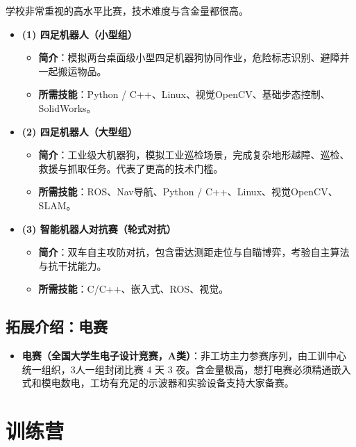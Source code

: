 \documentclass[a4paper,11pt,oneside]{scrreprt}
\begin{document}
学校非常重视的高水平比赛，技术难度与含金量都很高。

\begin{itemize}
    \item \textbf{(1) 四足机器人（小型组）}
    \begin{itemize}
        \item \textbf{简介}：模拟两台桌面级小型四足机器狗协同作业，危险标志识别、避障并一起搬运物品。
        \item \textbf{所需技能}：Python / C++、Linux、视觉OpenCV、基础步态控制、SolidWorks。
    \end{itemize}
    \item \textbf{(2) 四足机器人（大型组）}
    \begin{itemize}
        \item \textbf{简介}：工业级大机器狗，模拟工业巡检场景，完成复杂地形越障、巡检、救援与抓取任务。代表了更高的技术门槛。
        \item \textbf{所需技能}：ROS、Nav导航、Python / C++、Linux、视觉OpenCV、SLAM。
    \end{itemize}
    \item \textbf{(3) 智能机器人对抗赛（轮式对抗）}
    \begin{itemize}
        \item \textbf{简介}：双车自主攻防对抗，包含雷达测距走位与自瞄博弈，考验自主算法与抗干扰能力。
        \item \textbf{所需技能}：C/C++、嵌入式、ROS、视觉。
    \end{itemize}
\end{itemize}

\setcounter{subsection}{3}
\subsection{拓展介绍：电赛}

\begin{itemize}
    \item \textbf{电赛（全国大学生电子设计竞赛，A类）}：非工坊主力参赛序列，由工训中心统一组织，3人一组封闭比赛 4 天 3 夜。含金量极高，想打电赛必须精通嵌入式和模电数电，工坊有充足的示波器和实验设备支持大家备赛。
\end{itemize}

\clearpage

\section{训练营}
\end{document}
